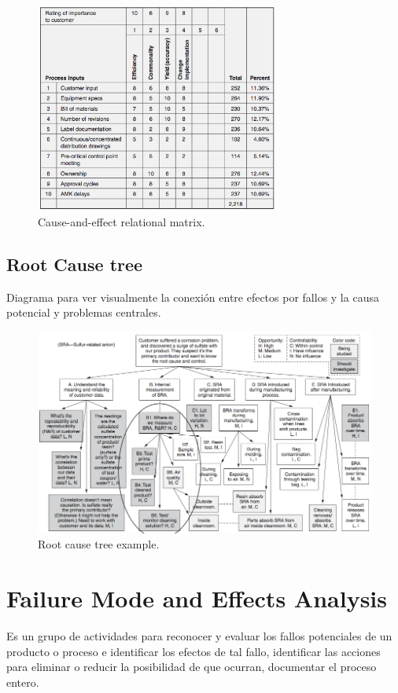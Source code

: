 \documentclass[oneside]{book}
\begin{document}
\begin{figure}[H]
	\centering
	\includegraphics[width=80mm]{imagenes/Cause-and-effectrelationalmatrix.png}
	\caption{Cause-and-effect relational matrix.}
	\label{fig:Cause-and-effectrelationalmatrix}
\end{figure}


\subsection{Root Cause tree}
Diagrama para ver visualmente la conexión entre efectos por fallos y la causa potencial y problemas centrales.

\begin{figure}[H]
	\centering
	\includegraphics[width=140mm]{imagenes/Rootcausetreeexample.png}
	\caption{Root cause tree example.}
	\label{fig:Rootcausetreeexample}
\end{figure}

\section{Failure Mode and Effects Analysis}
Es un grupo de actividades para reconocer y evaluar los fallos potenciales de un producto o proceso e identificar los efectos de tal fallo, identificar las acciones para eliminar o reducir la posibilidad de que ocurran, documentar el proceso entero.
\end{document}
